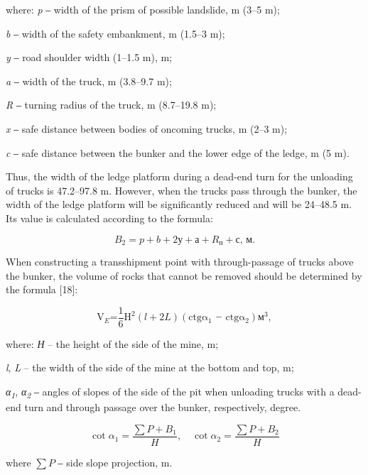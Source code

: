 \begin{multicols}{2}
where: \emph{p} ‒ width of the prism of possible landslide, m (3--5 m);

\emph{b} ‒ width of the safety embankment, m (1.5--3 m);

\emph{y} ‒ road shoulder width (1--1.5 m), m;

\emph{a} ‒ width of the truck, m (3.8--9.7 m);

\emph{R} ‒ turning radius of the truck, m (8.7--19.8 m);

\emph{x} ‒ safe distance between bodies of oncoming trucks, m (2--3 m);

\emph{c} ‒ safe distance between the bunker and the lower edge of the
ledge, m (5 m).

Thus, the width of the ledge platform during a dead-end turn for the
unloading of trucks is 47.2--97.8 m. However, when the trucks pass
through the bunker, the width of the ledge platform will be
significantly reduced and will be 24--48.5 m. Its value is calculated
according to the formula:

\begin{equation}
B_{2} = p + b + 2у + а + R_{\text{п}} + с, \, \text{м}.
\end{equation}

When constructing a transshipment point with through-passage of trucks
above the bunker, the volume of rocks that cannot be removed should be
determined by the formula {[}18{]}:

\begin{equation}
  \text{V}_{E}\text{=}\frac{\text{1}}{\text{6}}\text{H}^{\text{2}}\left(l + 2L \right)\left( \text{ctg}\text{α}_{1}\text{ ‒ ctg}\text{α}_{2} \right) \text{м}^{3},
\end{equation}

where: \emph{Н} -- the height of the side of the mine, m;

\emph{l}, \emph{L} -- the width of the side of the mine at the bottom
and top, m;

\emph{α\textsubscript{1}}, \emph{α\textsubscript{2}} ‒ angles of slopes
of the side of the pit when unloading trucks with a dead-end turn and
through passage over the bunker, respectively, degree.

\begin{equation}
\cot \alpha_{1} = \frac{\sum P + B_{1}}{H}, \quad \cot \alpha_{2} = \frac{\sum P + B_{2}}{H}
\end{equation}

where $\sum P$ ‒ side slope projection, m.


\end{multicols}
